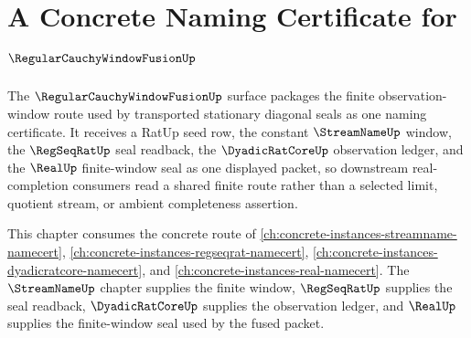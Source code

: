 \chapter{A Concrete Naming Certificate for $\RegularCauchyWindowFusionUp$}
\label{ch:concrete-instances-regularcauchywindowfusion-namecert}

The $\RegularCauchyWindowFusionUp$ surface packages the finite observation-window route used by transported stationary diagonal seals as one naming certificate. It receives a RatUp seed row, the constant $\StreamNameUp$ window, the $\RegSeqRatUp$ seal readback, the $\DyadicRatCoreUp$ observation ledger, and the $\RealUp$ finite-window seal as one displayed packet, so downstream real-completion consumers read a shared finite route rather than a selected limit, quotient stream, or ambient completeness assertion.

This chapter consumes the concrete route of \autoref{ch:concrete-instances-streamname-namecert}, \autoref{ch:concrete-instances-regseqrat-namecert}, \autoref{ch:concrete-instances-dyadicratcore-namecert}, and \autoref{ch:concrete-instances-real-namecert}. The $\StreamNameUp$ chapter supplies the finite window, $\RegSeqRatUp$ supplies the seal readback, $\DyadicRatCoreUp$ supplies the observation ledger, and $\RealUp$ supplies the finite-window seal used by the fused packet.

